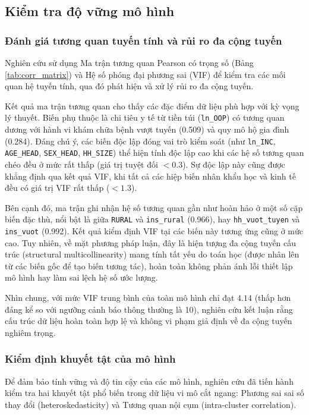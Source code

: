 \documentclass[12pt,a4paper]{article}
\begin{document}
\subsection{Kiểm tra độ vững mô hình}

\subsubsection{Đánh giá tương quan tuyến tính và rủi ro đa cộng tuyến}

Nghiên cứu sử dụng Ma trận tương quan Pearson có trọng số (Bảng \ref{tab:corr_matrix}) và Hệ số phóng đại phương sai (VIF) để kiểm tra các mối quan hệ tuyến tính, qua đó phát hiện và xử lý rủi ro đa cộng tuyến. 

Kết quả ma trận tương quan cho thấy các đặc điểm dữ liệu phù hợp với kỳ vọng lý thuyết. Biến phụ thuộc là chi tiêu y tế từ tiền túi (\texttt{ln\_OOP}) có tương quan dương với hành vi khám chữa bệnh vượt tuyến (0.509) và quy mô hộ gia đình (0.284). Đáng chú ý, các biến độc lập đóng vai trò kiểm soát (như \texttt{ln\_INC}, \texttt{AGE\_HEAD}, \texttt{SEX\_HEAD}, \texttt{HH\_SIZE}) thể hiện tính độc lập cao khi các hệ số tương quan chéo đều ở mức rất thấp (giá trị tuyệt đối $< 0.3$). Sự độc lập này cũng được khẳng định qua kết quả VIF, khi tất cả các hiệp biến nhân khẩu học và kinh tế đều có giá trị VIF rất thấp ($< 1.3$).

Bên cạnh đó, ma trận ghi nhận hệ số tương quan gần như hoàn hảo ở một số cặp biến đặc thù, nổi bật là giữa \texttt{RURAL} và \texttt{ins\_rural} (0.966), hay \texttt{hh\_vuot\_tuyen} và \texttt{ins\_vuot} (0.992). Kết quả kiểm định VIF tại các biến này tương ứng cũng ở mức cao. Tuy nhiên, về mặt phương pháp luận, đây là hiện tượng đa cộng tuyến cấu trúc (structural multicollinearity) mang tính tất yếu do toán học (được nhân lên từ các biến gốc để tạo biến tương tác), hoàn toàn không phản ánh lỗi thiết lập mô hình hay làm sai lệch hệ số ước lượng.

Nhìn chung, với mức VIF trung bình của toàn mô hình chỉ đạt $4.14$ (thấp hơn đáng kể so với ngưỡng cảnh báo thông thường là 10), nghiên cứu kết luận rằng cấu trúc dữ liệu hoàn toàn hợp lệ và không vi phạm giả định về đa cộng tuyến nghiêm trọng.

\subsubsection{Kiểm định khuyết tật của mô hình}

Để đảm bảo tính vững và độ tin cậy của các mô hình, nghiên cứu đã tiến hành kiểm tra hai khuyết tật phổ biến trong dữ liệu vi mô cắt ngang: Phương sai sai số thay đổi (heteroskedasticity) và Tương quan nội cụm (intra-cluster correlation).
\end{document}
